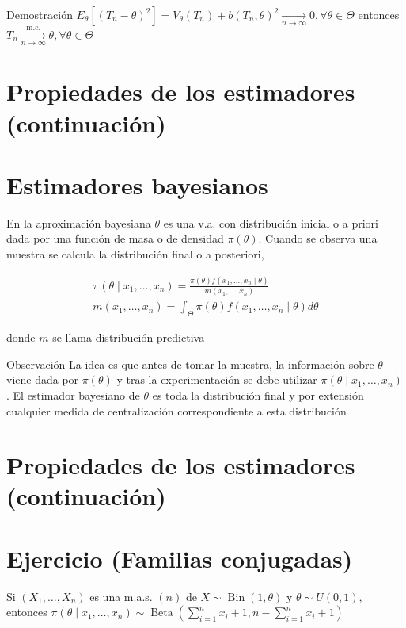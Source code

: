 Demostración $E_{\theta}\left[\left(T_{n}-\theta\right)^{2}\right]=V_{\theta}\left(T_{n}\right)+b\left(T_{n}, \theta\right)^{2} \underset{n \rightarrow \infty}{\longrightarrow} 0, \forall \theta \in \Theta$ entonces $T_{n} \xrightarrow[n \rightarrow \infty]{\text { m.c. }} \theta, \forall \theta \in \Theta$

\section*{Propiedades de los estimadores (continuación)}
\section*{Estimadores bayesianos}
En la aproximación bayesiana $\theta$ es una v.a. con distribución inicial o a priori dada por una función de masa o de densidad $\pi(\theta)$. Cuando se observa una muestra se calcula la distribución final o a posteriori,

$$
\begin{gathered}
\pi\left(\theta \mid x_{1}, \ldots, x_{n}\right)=\frac{\pi(\theta) f\left(x_{1}, \ldots, x_{n} \mid \theta\right)}{m\left(x_{1}, \ldots, x_{n}\right)} \\
m\left(x_{1}, \ldots, x_{n}\right)=\int_{\Theta} \pi(\theta) f\left(x_{1}, \ldots, x_{n} \mid \theta\right) d \theta
\end{gathered}
$$

donde $m$ se llama distribución predictiva

Observación La idea es que antes de tomar la muestra, la información sobre $\theta$ viene dada por $\pi(\theta)$ y tras la experimentación se debe utilizar $\pi\left(\theta \mid x_{1}, \ldots, x_{n}\right)$. El estimador bayesiano de $\theta$ es toda la distribución final y por extensión cualquier medida de centralización correspondiente a esta distribución

\section*{Propiedades de los estimadores (continuación)}
\section*{Ejercicio (Familias conjugadas)}
Si $\left(X_{1}, \ldots, X_{n}\right)$ es una m.a.s. $(n)$ de $X \sim \operatorname{Bin}(1, \theta)$ y $\theta \sim U(0,1)$, entonces $\pi\left(\theta \mid x_{1}, \ldots, x_{n}\right) \sim \operatorname{Beta}\left(\sum_{i=1}^{n} x_{i}+1, n-\sum_{i=1}^{n} x_{i}+1\right)$


